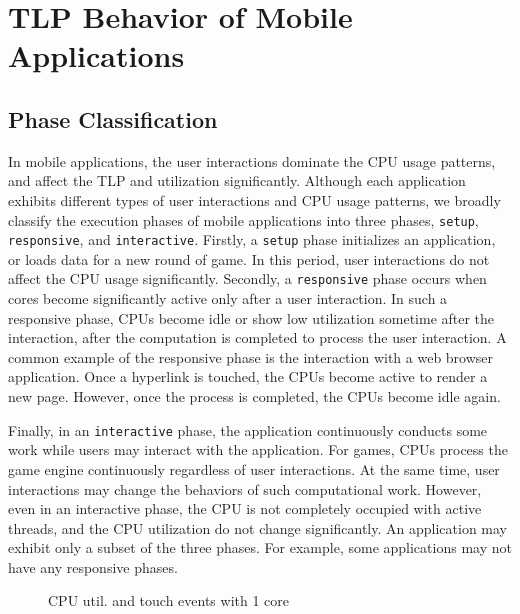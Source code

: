 \chapter{TLP Behavior of Mobile Applications}

\section{Phase Classification}

In mobile applications, the user interactions dominate the CPU usage patterns, and
affect the TLP and utilization significantly. Although each application exhibits
different types of user interactions and CPU usage patterns, we broadly classify
the execution phases of mobile applications into three phases, {\tt setup},
{\tt responsive}, and {\tt interactive}.
Firstly, a {\tt setup} phase initializes an application, or loads data for a new round 
of game. In this period, user interactions do not affect the CPU usage significantly.
Secondly, a {\tt responsive} phase occurs when cores become significantly active only after a user interaction.
In such a responsive phase, CPUs become idle or show low utilization sometime after the interaction, after
the computation is completed to process the user interaction. A common example of
the responsive phase is the interaction with a web browser application. Once
a hyperlink is touched, the CPUs become active to render a new page. However,
once the process is completed, the CPUs become idle again.

Finally, in an {\tt interactive} phase, the application continuously conducts some work
while users may interact with the application. For games, 
CPUs process the game engine continuously regardless of user interactions. At the same time,
user interactions may change the behaviors of such computational work.
However, even in an interactive phase, the CPU is not completely occupied with 
active threads, and the CPU utilization do not change significantly.
An application may exhibit only a subset of the three phases. For example, some applications
may not have any responsive phases.

\begin{figure}[bt]
\begin{center}
\end{center}
\caption{CPU util. and touch events with 1 core}
\label{fig:interact_util_1cpu}
\end{figure}

